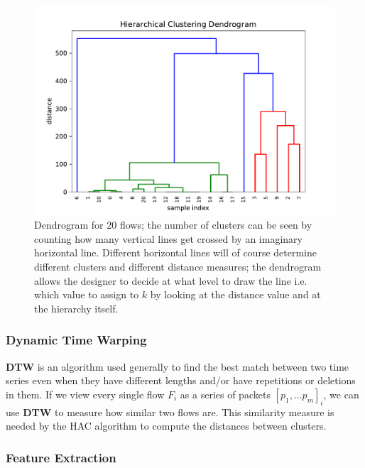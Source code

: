 \begin{figure}[!h]
 \centering
 \includegraphics[scale=0.5]{images/dendrogram}
 \caption{\small{Dendrogram for 20 flows; the number of clusters can be seen by counting how many vertical lines get crossed by an imaginary horizontal line. Different horizontal lines will of course determine different clusters and different distance measures; the dendrogram allows the designer to decide at what level to draw the line i.e. which value to assign to $k$ by looking at the distance value and at the hierarchy itself.}}
 \label{fig:dendro}
\end{figure}

\subsubsection{Dynamic Time Warping} \textbf{DTW} is an algorithm used generally to find the best match between two time series even when they have different lengths and/or have repetitions or deletions in them. If we view every single flow $F_i$ as a series of packets $[p_1,\dots p_m]_i$, we can use \textbf{DTW} to measure how similar two flows are. This similarity measure is needed by the HAC algorithm to compute the distances between clusters.

\subsubsection{Feature Extraction}

